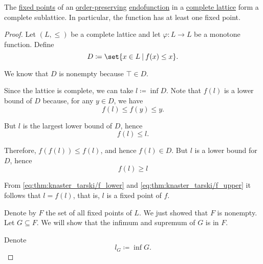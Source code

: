 \begin{theorem}\label{thm:knaster_tarski_theorem}
  The \hyperref[def:fixed_point]{fixed points} of an \hyperref[def:order_homomorphism]{order-preserving} \hyperref[def:function/endofunction]{endofunction} in a \hyperref[def:semilattice/lattice]{complete lattice} form a complete sublattice. In particular, the function has at least one fixed point.
\end{theorem}
\begin{proof}
   Let \( (L, \leq) \) be a complete lattice and let \( \varphi: L \to L \) be a monotone function. Define
  \begin{equation*}
    D \coloneqq \set{ x \in L \given f(x) \leq x }.
  \end{equation*}

  We know that \( D \) is nonempty because \( \top \in D \).

  Since the lattice is complete, we can take \( l \coloneqq \inf D \). Note that \( f(l) \) is a lower bound of \( D \) because, for any \( y \in D \), we have
  \begin{equation*}
    f(l) \leq f(y) \leq y.
  \end{equation*}

  But \( l \) is the largest lower bound of \( D \), hence
  \begin{equation}\label{eq:thm:knaster_tarski/f_lower}
    f(l) \leq l.
  \end{equation}

  Therefore, \( f(f(l)) \leq f(l) \), and hence \( f(l) \in D \). But \( l \) is a lower bound for \( D \), hence
  \begin{equation}\label{eq:thm:knaster_tarski/f_upper}
    f(l) \geq l
  \end{equation}

  From \eqref{eq:thm:knaster_tarski/f_lower} and \eqref{eq:thm:knaster_tarski/f_upper} it follows that \( l = f(l) \), that is, \( l \) is a fixed point of \( f \).

   Denote by \( F \) the set of all fixed points of \( L \). We just showed that \( F \) is nonempty. Let \( G \subseteq F \). We will show that the infimum and supremum of \( G \) is in \( F \).

  Denote
  \begin{equation*}
    l_G \coloneqq \inf G.
  \end{equation*}


\end{proof}
